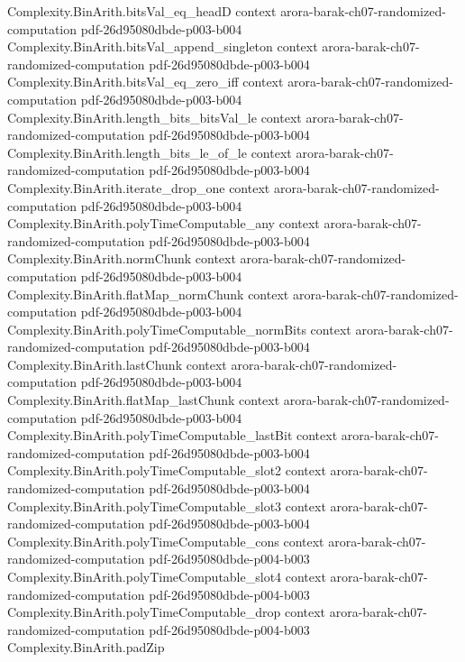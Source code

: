 \begin{theorem}
\proofstep
  {Complexity.BinArith.bitsVal_eq_headD}
  {context}
  {arora-barak-ch07-randomized-computation}
  {pdf-26d95080dbde-p003-b004}
\proofstep
  {Complexity.BinArith.bitsVal_append_singleton}
  {context}
  {arora-barak-ch07-randomized-computation}
  {pdf-26d95080dbde-p003-b004}
\proofstep
  {Complexity.BinArith.bitsVal_eq_zero_iff}
  {context}
  {arora-barak-ch07-randomized-computation}
  {pdf-26d95080dbde-p003-b004}
\proofstep
  {Complexity.BinArith.length_bits_bitsVal_le}
  {context}
  {arora-barak-ch07-randomized-computation}
  {pdf-26d95080dbde-p003-b004}
\proofstep
  {Complexity.BinArith.length_bits_le_of_le}
  {context}
  {arora-barak-ch07-randomized-computation}
  {pdf-26d95080dbde-p003-b004}
\proofstep
  {Complexity.BinArith.iterate_drop_one}
  {context}
  {arora-barak-ch07-randomized-computation}
  {pdf-26d95080dbde-p003-b004}
\proofstep
  {Complexity.BinArith.polyTimeComputable_any}
  {context}
  {arora-barak-ch07-randomized-computation}
  {pdf-26d95080dbde-p003-b004}
\proofstep
  {Complexity.BinArith.normChunk}
  {context}
  {arora-barak-ch07-randomized-computation}
  {pdf-26d95080dbde-p003-b004}
\proofstep
  {Complexity.BinArith.flatMap_normChunk}
  {context}
  {arora-barak-ch07-randomized-computation}
  {pdf-26d95080dbde-p003-b004}
\proofstep
  {Complexity.BinArith.polyTimeComputable_normBits}
  {context}
  {arora-barak-ch07-randomized-computation}
  {pdf-26d95080dbde-p003-b004}
\proofstep
  {Complexity.BinArith.lastChunk}
  {context}
  {arora-barak-ch07-randomized-computation}
  {pdf-26d95080dbde-p003-b004}
\proofstep
  {Complexity.BinArith.flatMap_lastChunk}
  {context}
  {arora-barak-ch07-randomized-computation}
  {pdf-26d95080dbde-p003-b004}
\proofstep
  {Complexity.BinArith.polyTimeComputable_lastBit}
  {context}
  {arora-barak-ch07-randomized-computation}
  {pdf-26d95080dbde-p003-b004}
\proofstep
  {Complexity.BinArith.polyTimeComputable_slot2}
  {context}
  {arora-barak-ch07-randomized-computation}
  {pdf-26d95080dbde-p003-b004}
\proofstep
  {Complexity.BinArith.polyTimeComputable_slot3}
  {context}
  {arora-barak-ch07-randomized-computation}
  {pdf-26d95080dbde-p003-b004}
\proofstep
  {Complexity.BinArith.polyTimeComputable_cons}
  {context}
  {arora-barak-ch07-randomized-computation}
  {pdf-26d95080dbde-p004-b003}
\proofstep
  {Complexity.BinArith.polyTimeComputable_slot4}
  {context}
  {arora-barak-ch07-randomized-computation}
  {pdf-26d95080dbde-p004-b003}
\proofstep
  {Complexity.BinArith.polyTimeComputable_drop}
  {context}
  {arora-barak-ch07-randomized-computation}
  {pdf-26d95080dbde-p004-b003}
\proofstep
  {Complexity.BinArith.padZip}

\end{theorem}
